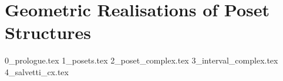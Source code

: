 \documentclass[class=article, crop=false]{standalone}
\begin{document}
\section{Geometric Realisations of Poset Structures}
{0_prologue.tex}
{1_posets.tex}
{2_poset_complex.tex}
{3_interval_complex.tex}
{4_salvetti_cx.tex}
\end{document}

